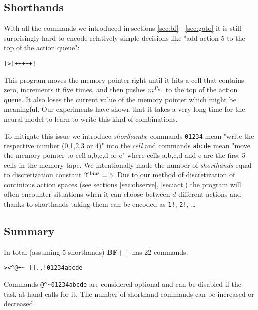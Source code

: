 \subsection{Shorthands}
\label{sec:shorthands}

With all the commands we introduced in sections \ref{sec:bf} - \ref{sec:goto} it is still surprisingly hard to encode relatively simple decisions like "add action 5 to the top of the action queue":

\begin{center}
\begin{lstlisting}
[>]+++++!
\end{lstlisting}
\end{center}

This program moves the memory pointer right until it hits a cell that contains zero, increments it five times, and then pushes $m^{P_m}$ to the top of the action queue. It also loses the current value of the memory pointer which might be meaningful. Our experiments have shown that it takes a very long time for the neural model to learn to write this kind of combinations.

To mitigate this issue we introduce \textit{shorthands}: commands \texttt{01234} mean "write the respective number (0,1,2,3 or 4)" into the \textit{cell} and commands \texttt{abcde} mean "move the memory pointer to cell a,b,c,d or e" where cells a,b,c,d and e are the first 5 cells in the memory tape.
We intentionally made the number of \textit{shorthands} equal to discretization constant $\Upsilon^\text{bins}=5$.
Due to our method of discretization of continious action spaces (see sections \ref{sec:observe}, \ref{sec:act}) the program will often encounter situations when it can choose between $d$ different actions and thanks to shorthands taking them can be encoded as \texttt{1!}, \texttt{2!}, \dots

\subsection{Summary}
\label{sec:summary}

In total (assuming 5 shorthands) \textbf{BF++} has 22 commands:

\begin{center}
\begin{lstlisting}
><^@+~-[].,!01234abcde
\end{lstlisting}
\end{center}

Commands \verb|@^~01234abcde| are considered optional and can be disabled if the task at hand calls for it.
The number of shorthand commands can be increased or decreased.

